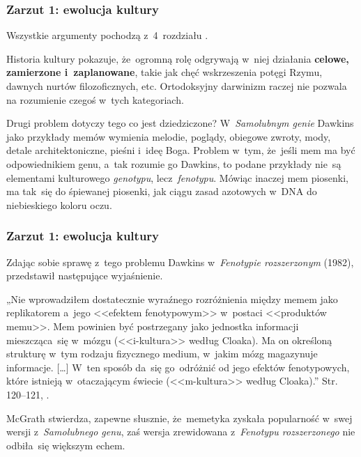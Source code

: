 \documentclass[10pt,t]{beamer}
\begin{document}
\begin{frame}
  \frametitle{Zarzut 1: ewolucja kultury}

  Wszystkie argumenty pochodzą z~4~rozdziału \cite{McGrathBogDawkinsa2008}.

  Historia kultury pokazuje, że~ogromną rolę odgrywają w~niej działania
  \textbf{celowe, zamierzone i~zaplanowane}, takie jak chęć wskrzeszenia
  potęgi Rzymu, dawnych nurtów filozoficznych, etc. Ortodoksyjny darwinizm
  raczej nie pozwala na rozumienie czegoś w~tych kategoriach.


  Drugi problem dotyczy tego co jest dziedziczone?
  W~\textit{Samolubnym genie} Dawkins jako przykłady memów wymienia
  melodie, poglądy, obiegowe zwroty, mody, detale architektoniczne,
  pieśni i~ideę Boga. Problem w~tym, że~jeśli mem ma być
  odpowiednikiem genu, a~tak rozumie go Dawkins, to podane przykłady
  nie~są elementami kulturowego \textit{genotypu}, lecz~\textit{fenotypu}.
  Mówiąc inaczej mem piosenki, ma tak~się do śpiewanej piosenki, jak
  ciągu zasad azotowych w~DNA do niebieskiego koloru oczu.

\end{frame}





\begin{frame}
  \frametitle{Zarzut 1: ewolucja kultury}


  Zdając sobie sprawę z~tego problemu Dawkins w~\textit{Fenotypie
    rozszerzonym} (1982), przedstawił
  następujące wyjaśnienie.

  „Nie wprowadziłem dostatecznie wyraźnego rozróżnienia między memem
  jako replikatorem a~jego <<efektem fenotypowym>> w~postaci
  <<produktów memu>>. Mem powinien być postrzegany jako jednostka
  informacji mieszcząca~się w~mózgu (<<i-kultura>> według Cloaka).
  Ma on określoną strukturę w~tym rodzaju fizycznego medium, w~jakim
  mózg magazynuje informacje. [\ldots] W~ten sposób da~się go~odróżnić od
  jego efektów fenotypowych, które istnieją w~otaczającym świecie
  (<<m-kultura>> według Cloaka).” Str. 120--121,
  \cite{McGrathBogDawkinsa2008}.

  McGrath stwierdza, zapewne słusznie, że~memetyka
  zyskała popularność w~swej wersji z~\textit{Samolubnego genu}, zaś
  wersja zrewidowana z~\textit{Fenotypu rozszerzonego} nie odbiła~się
  większym echem.

\end{frame}
\end{document}
